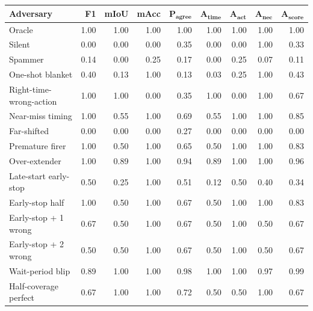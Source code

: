 \begin{tabular}{lrrrrrrrr}
\toprule
\textbf{Adversary} & \textbf{F1} & \textbf{mIoU} & \textbf{mAcc} & $\bm{P_{agree}}$ & $\bm{A_{time}}$ & $\bm{A_{act}}$ & $\bm{A_{nec}}$ & $\bm{A_{score}}$ \\
\midrule
Oracle & 1.00 & 1.00 & 1.00 & 1.00 & 1.00 & 1.00 & 1.00 & 1.00 \\
Silent & 0.00 & 0.00 & 0.00 & 0.35 & 0.00 & 0.00 & 1.00 & 0.33 \\
Spammer & 0.14 & 0.00 & 0.25 & 0.17 & 0.00 & 0.25 & 0.07 & 0.11 \\
One-shot blanket & 0.40 & 0.13 & 1.00 & 0.13 & 0.03 & 0.25 & 1.00 & 0.43 \\
Right-time-wrong-action & 1.00 & 1.00 & 0.00 & 0.35 & 1.00 & 0.00 & 1.00 & 0.67 \\
Near-miss timing & 1.00 & 0.55 & 1.00 & 0.69 & 0.55 & 1.00 & 1.00 & 0.85 \\
Far-shifted & 0.00 & 0.00 & 0.00 & 0.27 & 0.00 & 0.00 & 0.00 & 0.00 \\
Premature firer & 1.00 & 0.50 & 1.00 & 0.65 & 0.50 & 1.00 & 1.00 & 0.83 \\
Over-extender & 1.00 & 0.89 & 1.00 & 0.94 & 0.89 & 1.00 & 1.00 & 0.96 \\
Late-start early-stop & 0.50 & 0.25 & 1.00 & 0.51 & 0.12 & 0.50 & 0.40 & 0.34 \\
Early-stop half & 1.00 & 0.50 & 1.00 & 0.67 & 0.50 & 1.00 & 1.00 & 0.83 \\
Early-stop + 1 wrong & 0.67 & 0.50 & 1.00 & 0.67 & 0.50 & 1.00 & 0.50 & 0.67 \\
Early-stop + 2 wrong & 0.50 & 0.50 & 1.00 & 0.67 & 0.50 & 1.00 & 0.50 & 0.67 \\
Wait-period blip & 0.89 & 1.00 & 1.00 & 0.98 & 1.00 & 1.00 & 0.97 & 0.99 \\
Half-coverage perfect & 0.67 & 1.00 & 1.00 & 0.72 & 0.50 & 0.50 & 1.00 & 0.67 \\
\bottomrule
\end{tabular}

